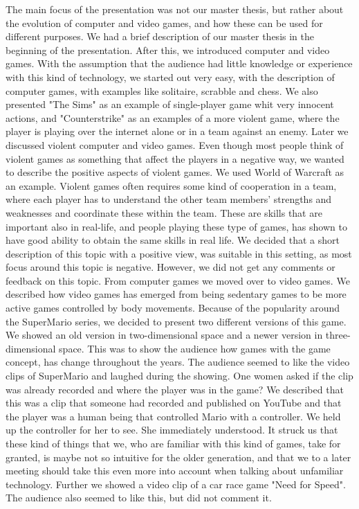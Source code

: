 The main focus of the presentation was not our master thesis, but rather about the evolution of computer and video games, and how these can be used for different purposes. We had a brief description of our master thesis in the beginning of the presentation. After this, we introduced computer and video games. With the assumption that the audience had little knowledge or experience with this kind of technology, we started out very easy, with the description of computer games, with examples like solitaire, scrabble and chess. We also presented "The Sims" as an example of single-player game whit very innocent actions, and "Counterstrike" as an examples of a more violent game, where the player is playing over the internet alone or in a team against an enemy. Later we discussed violent computer and video games. Even though most people think of violent games as something that affect the players in a negative way, we wanted to describe the positive aspects of violent games. We used World of Warcraft as an example. Violent games often requires some kind of cooperation in a team, where each player has to understand the other team members' strengths and weaknesses and coordinate these within the team. These are skills that are important also in real-life, and people playing these type of games, has shown to have good ability to obtain the same skills in real life. We decided that a short description of this topic with a positive view, was suitable in this setting, as most focus around this topic is negative. However, we did not get any comments or feedback on this topic. From computer games we moved over to video games. We described how video games has emerged from being sedentary games to be more active games controlled by body movements. Because of the popularity around the SuperMario series, we decided to present two different versions of this game. We showed an old version in two-dimensional space and a newer version in three-dimensional space. This was to show the audience how games with the game concept, has change throughout the years. The audience seemed to like the video clips of SuperMario and laughed during the showing. One women asked if the clip was already recorded and where the player was in the game? We described that this was a clip that someone had recorded and published on YouTube and that the player was a human being that controlled Mario with a controller. We held up the controller for her to see. She immediately understood. It struck us that these kind of things that we, who are familiar with this kind of games, take for granted, is maybe not so intuitive for the older generation, and that we to a later meeting should take this even more into account when talking about unfamiliar technology. Further we showed a video clip of a car race game "Need for Speed". The audience also seemed to like this, but did not comment it. 

